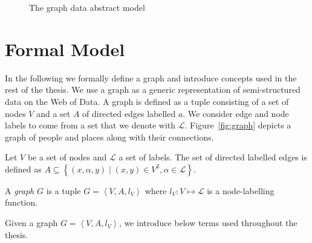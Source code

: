 \begin{figure}
	\centering
	\resizebox{.8\textwidth}{!}{
		
	}
	\caption{The graph data abstract model}
	\label{fig:gdm}
\end{figure}

\section{Formal Model}
\label{sec:gdm:formal-model}

In the following we formally define a graph and introduce concepts used in the rest of the thesis. We use a graph as a generic representation of semi-structured data on the Web of Data. A graph is defined as a tuple consisting of a set of nodes $V$ and a set $A$ of directed edges labelled $a$. We consider edge and node labels to come from a set that we denote with $\mathcal{L}$. Figure~\ref{fig:graph} depicts a graph of people and places along with their connections.

\begin{definition}[Graph]
	Let $V$ be a set of nodes and $\mathcal{L}$ a set of labels. The set of directed labelled edges is defined as $A \subseteq \left\lbrace (x, \alpha, y) \mid (x, y) \in V^2, \alpha \in \mathcal{L} \right\rbrace$.

	A \emph{graph} $G$ is a tuple $G = \left\langle V, A, l_V \right\rangle$ where $l_V : V \mapsto \mathcal{L}$ is a node-labelling function.
\end{definition}

Given a graph $G = \left\langle V, A, l_V \right\rangle$, we introduce below terms used throughout the thesis.

